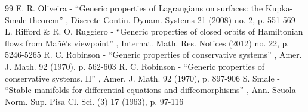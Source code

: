 \documentclass[10pt]{amsart}
\theoremstyle{plain}
\theoremstyle{definition}
\begin{document}
\begin{thebibliography}{99}
 E. R. Oliveira - “Generic properties of Lagrangians on surfaces: the Kupka-Smale theorem” , Discrete Contin. Dynam. Systems 21 (2008) no. 2, p. 551-569
 L. Rifford \& R. O. Ruggiero - “Generic properties of closed orbits of Hamiltonian flows from Mañé’s viewpoint” , Internat. Math. Res. Notices (2012) no. 22, p. 5246-5265
 R. C. Robinson - “Generic properties of conservative systems” , Amer. J. Math. 92 (1970), p. 562-603
 R. C. Robinson - “Generic properties of conservative systems. II” , Amer. J. Math. 92 (1970), p. 897-906
 S. Smale - “Stable manifolds for differential equations and diffeomorphisms” , Ann. Scuola Norm. Sup. Pisa Cl. Sci. (3) 17 (1963), p. 97-116
\end{thebibliography}
\end{document}
